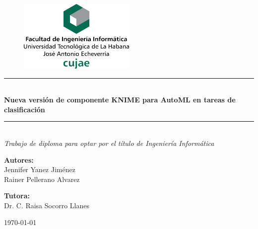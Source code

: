 \begin{figure}
	\centering
	\includegraphics[width=0.5\textwidth]{figuras/membrete-cujae-centrado.png}
\end{figure}
	\begin{center}
	\newcommand{\HRule}{\rule{\linewidth}{0.8mm}}
	
	\vspace*{0.5cm}
	
	\HRule \\[0.4cm]

	\LARGE{\textbf{Nueva versión de componente KNIME para AutoML en tareas de clasificación}}

	\HRule \\[1.5cm]
	
    \textit{\large{Trabajo de diploma para optar por el título de Ingeniería Informática}}

	\vspace{1.5cm}
	
	\large{
	\textbf{Autores:} \\
	Jennifer Yanez Jiménez\\
	Rainer Pellerano Alvarez\\
	\vspace{1.5cm}
	
	\textbf{Tutora:}\\
	Dr. C. Raisa Socorro Llanes\\
	}
	
	\vspace{2cm}
	
	{\mifecha\today}
	
\end{center}	


